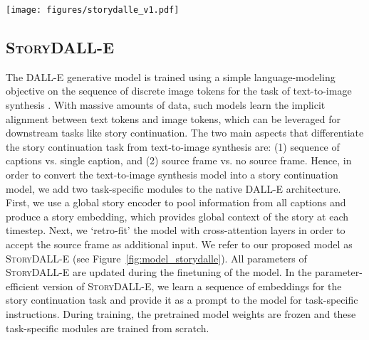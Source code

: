 \documentclass[runningheads]{llncs}
\newcommand{\sdalle}[1]{\textsc{StoryDALL-E}}
\begin{document}
\begin{figure*}[t]
    \centering
    \texttt{[image: figures/storydalle\_v1.pdf]}
    \caption{Illustration of our \sdalle{} architecture for the prompt-tuning setting. The frames are encoded using pretrained VQVAE and sent as inputs to the pretrained DALL-E. The inputs are prepended with input-agnostic prompt (in prompt-tuning setting only) and global story embeddings corresponding to each sample in the story continuation dataset. The output of \sdalle{} is decoded using VQ-VAE to generate the predicted image.
    \label{fig:model_storydalle}}
\end{figure*}

\subsection{\sdalle{}}
\label{sec:storydalle}

The DALL-E generative model is trained using a simple language-modeling objective on the sequence of discrete image tokens for the task of text-to-image synthesis \cite{ramesh2021zero}. With massive amounts of data, such models learn the implicit alignment between text tokens and image tokens, which can be leveraged for downstream tasks like story continuation. The two main aspects that differentiate the story continuation task from text-to-image synthesis are: (1) sequence of captions vs. single caption, and (2) source frame vs. no source frame. Hence, in order to convert the text-to-image synthesis model into a story continuation model, we add two task-specific modules to the native DALL-E architecture. First, we use a global story encoder to pool information from all captions and produce a story embedding, which provides global context of the story at each timestep. Next, we `retro-fit' the model with cross-attention layers in order to accept the source frame as additional input. We refer to our proposed model as \sdalle{} (see Figure~\ref{fig:model_storydalle}). All parameters of \sdalle{} are updated during the finetuning of the model. In the parameter-efficient version of \sdalle{}, we learn a sequence of embeddings for the story continuation task and provide it as a prompt to the model for task-specific instructions. During training, the pretrained model weights are frozen and these task-specific modules are trained from scratch.
\end{document}
